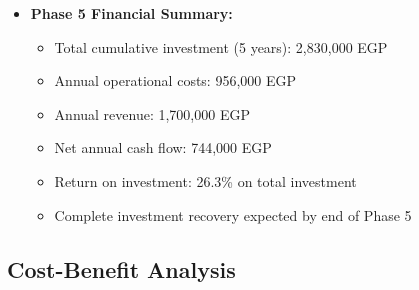 \begin{itemize}
    \item \textbf{Phase 5 Financial Summary:}
    \begin{itemize}
        \item Total cumulative investment (5 years): 2,830,000 EGP
        \item Annual operational costs: 956,000 EGP
        \item Annual revenue: 1,700,000 EGP
        \item Net annual cash flow: 744,000 EGP
        \item Return on investment: 26.3\% on total investment
        \item Complete investment recovery expected by end of Phase 5
    \end{itemize}
\end{itemize}

\subsection{Cost-Benefit Analysis}

